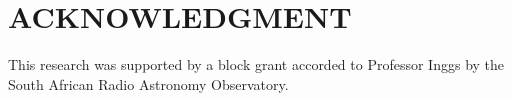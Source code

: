 \documentclass[conference]{IEEEtran}
\begin{document}






\section*{ACKNOWLEDGMENT}

This research was supported by a block grant accorded to Professor Inggs by the South African Radio Astronomy Observatory.



\end{document}
